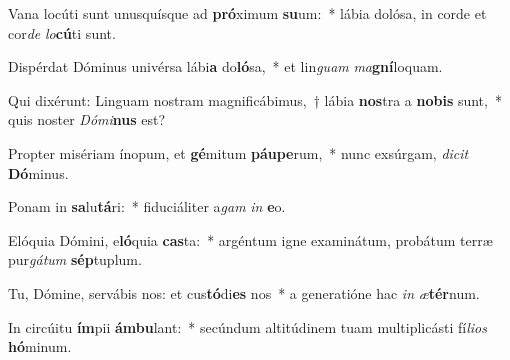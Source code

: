 \item Vana locúti sunt unusquísque ad \textbf{pró}ximum \textbf{su}um:~* lábia dolósa, in corde et cor\textit{de} \textit{lo}\textbf{cú}ti sunt.
\item Dispérdat Dóminus univérsa lábi\textbf{a} do\textbf{ló}sa,~* et lin\textit{guam} \textit{ma}\textbf{gní}loquam.
\item Qui dixérunt: Linguam nostram magnificábimus,~† lábia \textbf{nos}tra a \textbf{no}\textbf{bis} sunt,~* quis noster \textit{Dó}\textit{mi}\textbf{nus} est?
\item Propter misériam ínopum, et \textbf{gé}mitum \textbf{páu}\textbf{pe}rum,~* nunc exsúrgam, \textit{di}\textit{cit} \textbf{Dó}minus.
\item Ponam in \textbf{sa}lu\textbf{tá}ri:~* fiduciáliter a\textit{gam} \textit{in} \textbf{e}o.
\item Elóquia Dómini, e\textbf{ló}quia \textbf{cas}ta:~* argéntum igne examinátum, probátum terræ pur\textit{gá}\textit{tum} \textbf{sép}tuplum.
\item Tu, Dómine, servábis nos: et cus\textbf{tó}di\textbf{es} nos~* a generatióne hac \textit{in} \textit{æ}\textbf{tér}num.
\item In circúitu \textbf{ím}pii \textbf{ám}\textbf{bu}lant:~* secúndum altitúdinem tuam multiplicásti fí\textit{li}\textit{os} \textbf{hó}minum.
